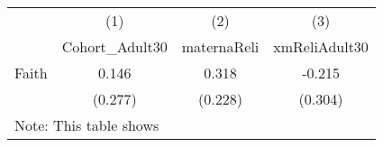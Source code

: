 {
\def\sym#1{\ifmmode^{#1}\else\(^{#1}\)\fi}
\begin{tabular}{l*{3}{c}}
\hline\hline
            &\multicolumn{1}{c}{(1)}&\multicolumn{1}{c}{(2)}&\multicolumn{1}{c}{(3)}\\
            &\multicolumn{1}{c}{Cohort\_Adult30}&\multicolumn{1}{c}{maternaReli}&\multicolumn{1}{c}{xmReliAdult30}\\
\hline
Faith       &       0.146         &       0.318         &      -0.215         \\
            &     (0.277)         &     (0.228)         &     (0.304)         \\
\hline\hline
\multicolumn{4}{l}{\footnotesize Note: This table shows}\\
\end{tabular}
}
